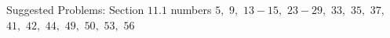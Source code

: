 \documentclass[letterpaper, twoside, 12pt]{book}
\theoremstyle{definition}
\theoremstyle{definition}
\newtheorem{definition}[theorem]{Definition}
\newtheorem{observation}[theorem]{Observation}
\newcommand{\ds}{\ensuremath{\displaystyle}}
\begin{document}
\vspace{3in}

\noindent Suggested Problems: Section $11.1$ numbers $5,$ $9,$ $13 - 15,$ $23 - 29,$ $33,$ $35,$ $37,$ $41,$ $42,$ $44,$ $49,$ $50,$ $53,$ $56$






\end{document}
